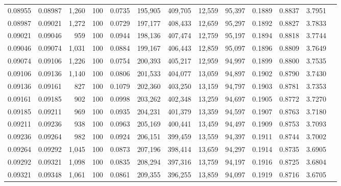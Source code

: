 \begin{tabular}{rrrrrrrrrrrrr}
0.08955 & 0.08987 & 1,260 & 100 &                                     0.0735 & 195,905 & 409,705 &  12,559 &  95,397 & 0.1889 & 0.8837 & 3.7951 \\
0.08987 & 0.09021 & 1,272 & 100 &                                     0.0729 & 197,177 & 408,433 &  12,659 &  95,297 & 0.1892 & 0.8827 & 3.7833 \\
0.09021 & 0.09046 &   959 & 100 &                                     0.0944 & 198,136 & 407,474 &  12,759 &  95,197 & 0.1894 & 0.8818 & 3.7744 \\
0.09046 & 0.09074 & 1,031 & 100 &                                     0.0884 & 199,167 & 406,443 &  12,859 &  95,097 & 0.1896 & 0.8809 & 3.7649 \\
0.09074 & 0.09106 & 1,226 & 100 &                                     0.0754 & 200,393 & 405,217 &  12,959 &  94,997 & 0.1899 & 0.8800 & 3.7535 \\
0.09106 & 0.09136 & 1,140 & 100 &                                     0.0806 & 201,533 & 404,077 &  13,059 &  94,897 & 0.1902 & 0.8790 & 3.7430 \\
0.09136 & 0.09161 &   827 & 100 &                                     0.1079 & 202,360 & 403,250 &  13,159 &  94,797 & 0.1903 & 0.8781 & 3.7353 \\
0.09161 & 0.09185 &   902 & 100 &                                     0.0998 & 203,262 & 402,348 &  13,259 &  94,697 & 0.1905 & 0.8772 & 3.7270 \\
0.09185 & 0.09211 &   969 & 100 &                                     0.0935 & 204,231 & 401,379 &  13,359 &  94,597 & 0.1907 & 0.8763 & 3.7180 \\
0.09211 & 0.09236 &   938 & 100 &                                     0.0963 & 205,169 & 400,441 &  13,459 &  94,497 & 0.1909 & 0.8753 & 3.7093 \\
0.09236 & 0.09264 &   982 & 100 &                                     0.0924 & 206,151 & 399,459 &  13,559 &  94,397 & 0.1911 & 0.8744 & 3.7002 \\
0.09264 & 0.09292 & 1,045 & 100 &                                     0.0873 & 207,196 & 398,414 &  13,659 &  94,297 & 0.1914 & 0.8735 & 3.6905 \\
0.09292 & 0.09321 & 1,098 & 100 &                                     0.0835 & 208,294 & 397,316 &  13,759 &  94,197 & 0.1916 & 0.8725 & 3.6804 \\
0.09321 & 0.09348 & 1,061 & 100 &                                     0.0861 & 209,355 & 396,255 &  13,859 &  94,097 & 0.1919 & 0.8716 & 3.6705 \\

\end{tabular}
